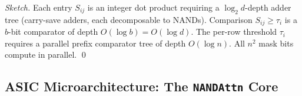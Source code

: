 \begin{proof}[Sketch]





Each entry $S_{ij}$ is an integer dot product requiring a $\log_2 d$-depth adder tree (carry-save adders, each decomposable to NANDs). Comparison $S_{ij} \ge \tau_i$ is a $b$-bit comparator of depth $O(\log b) = O(\log d)$. The per-row threshold $\tau_i$ requires a parallel prefix comparator tree of depth $O(\log n)$. All $n^2$ mask bits compute in parallel. \qed





\end{proof}











\subsection{ASIC Microarchitecture: The \texttt{NANDAttn} Core}











